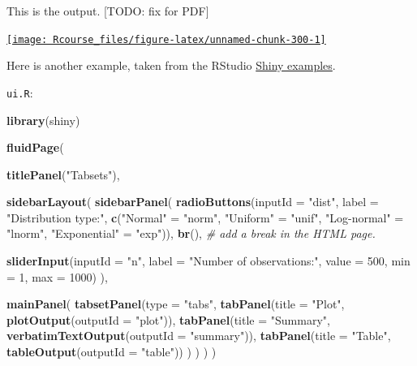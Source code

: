 \documentclass[]{book}
\newenvironment{Shaded}{\begin{snugshade}}{\end{snugshade}}
\newcommand{\KeywordTok}[1]{\textcolor[rgb]{0.13,0.29,0.53}{\textbf{#1}}}
\newcommand{\DataTypeTok}[1]{\textcolor[rgb]{0.13,0.29,0.53}{#1}}
\newcommand{\DecValTok}[1]{\textcolor[rgb]{0.00,0.00,0.81}{#1}}
\newcommand{\StringTok}[1]{\textcolor[rgb]{0.31,0.60,0.02}{#1}}
\newcommand{\CommentTok}[1]{\textcolor[rgb]{0.56,0.35,0.01}{\textit{#1}}}
\newcommand{\NormalTok}[1]{#1}
\theoremstyle{definition}
\theoremstyle{definition}
\theoremstyle{definition}
\theoremstyle{remark}
\begin{document}
This is the output. {[}TODO: fix for PDF{]}

\href{http://shiny.rstudio.com/gallery/example-01-hello.html}{\texttt{[image: Rcourse\_files/figure-latex/unnamed-chunk-300-1]} }

Here is another example, taken from the RStudio
\href{https://github.com/rstudio/shiny-examples/tree/master/006-tabsets}{Shiny
examples}.

\texttt{ui.R}:

\begin{Shaded}
\begin{Highlighting}[]
\KeywordTok{library}\NormalTok{(shiny)}

\KeywordTok{fluidPage}\NormalTok{(}
    
  \KeywordTok{titlePanel}\NormalTok{(}\StringTok{"Tabsets"}\NormalTok{),}
  
  \KeywordTok{sidebarLayout}\NormalTok{(}
    \KeywordTok{sidebarPanel}\NormalTok{(}
      \KeywordTok{radioButtons}\NormalTok{(}\DataTypeTok{inputId =} \StringTok{"dist"}\NormalTok{, }
                   \DataTypeTok{label =} \StringTok{"Distribution type:"}\NormalTok{,}
                   \KeywordTok{c}\NormalTok{(}\StringTok{"Normal"}\NormalTok{ =}\StringTok{ "norm"}\NormalTok{,}
                     \StringTok{"Uniform"}\NormalTok{ =}\StringTok{ "unif"}\NormalTok{,}
                     \StringTok{"Log-normal"}\NormalTok{ =}\StringTok{ "lnorm"}\NormalTok{,}
                     \StringTok{"Exponential"}\NormalTok{ =}\StringTok{ "exp"}\NormalTok{)),}
      \KeywordTok{br}\NormalTok{(), }\CommentTok{# add a break in the HTML page.}
      
      \KeywordTok{sliderInput}\NormalTok{(}\DataTypeTok{inputId =} \StringTok{"n"}\NormalTok{, }
                  \DataTypeTok{label =} \StringTok{"Number of observations:"}\NormalTok{, }
                   \DataTypeTok{value =} \DecValTok{500}\NormalTok{,}
                   \DataTypeTok{min =} \DecValTok{1}\NormalTok{, }
                   \DataTypeTok{max =} \DecValTok{1000}\NormalTok{)}
\NormalTok{    ),}
    
    \KeywordTok{mainPanel}\NormalTok{(}
      \KeywordTok{tabsetPanel}\NormalTok{(}\DataTypeTok{type =} \StringTok{"tabs"}\NormalTok{, }
        \KeywordTok{tabPanel}\NormalTok{(}\DataTypeTok{title =} \StringTok{"Plot"}\NormalTok{, }\KeywordTok{plotOutput}\NormalTok{(}\DataTypeTok{outputId =} \StringTok{"plot"}\NormalTok{)), }
        \KeywordTok{tabPanel}\NormalTok{(}\DataTypeTok{title =} \StringTok{"Summary"}\NormalTok{, }\KeywordTok{verbatimTextOutput}\NormalTok{(}\DataTypeTok{outputId =} \StringTok{"summary"}\NormalTok{)), }
        \KeywordTok{tabPanel}\NormalTok{(}\DataTypeTok{title =} \StringTok{"Table"}\NormalTok{, }\KeywordTok{tableOutput}\NormalTok{(}\DataTypeTok{outputId =} \StringTok{"table"}\NormalTok{))}
\NormalTok{      )}
\NormalTok{    )}
\NormalTok{  )}
\NormalTok{)}
\end{Highlighting}
\end{Shaded}
\end{document}
